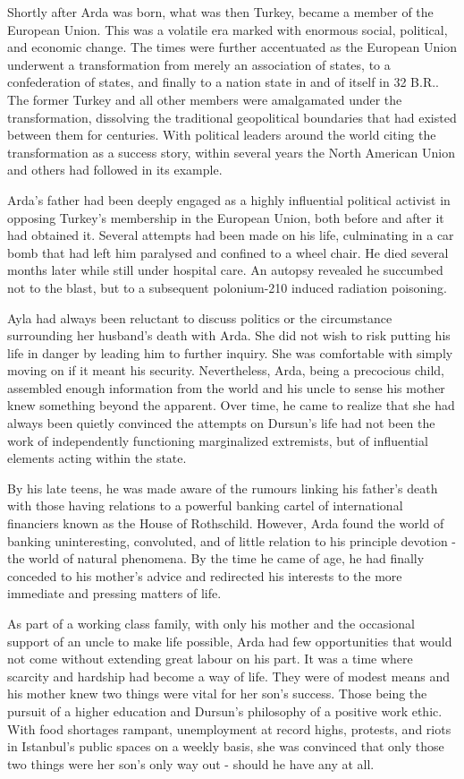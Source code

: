 Shortly after Arda was born, what was then Turkey, became a member of the European Union. This was a volatile era marked with enormous social, political, and economic change. The times were further accentuated as the European Union underwent a transformation from merely an association of states, to a confederation of states, and finally to a nation state in and of itself in 32 B.R.. The former Turkey and all other members were amalgamated under the transformation, dissolving the traditional geopolitical boundaries that had existed between them for centuries. With political leaders around the world citing the transformation as a success story, within several years the North American Union and others had followed in its example.

Arda's father had been deeply engaged as a highly influential political activist in opposing Turkey's membership in the European Union, both before and after it had obtained it. Several attempts had been made on his life, culminating in a car bomb that had left him paralysed and confined to a wheel chair. He died several months later while still under hospital care. An autopsy revealed he succumbed not to the blast, but to a subsequent polonium-210 induced radiation poisoning.

Ayla had always been reluctant to discuss politics or the circumstance surrounding her husband's death with Arda. She did not wish to risk putting his life in danger by leading him to further inquiry. She was comfortable with simply moving on if it meant his security. Nevertheless, Arda, being a precocious child, assembled enough information from the world and his uncle to sense his mother knew something beyond the apparent. Over time, he came to realize that she had always been quietly convinced the attempts on Dursun's life had not been the work of independently functioning marginalized extremists, but of influential elements acting within the state.

By his late teens, he was made aware of the rumours linking his father's death with those having relations to a powerful banking cartel of international financiers known as the House of Rothschild. However, Arda found the world of banking uninteresting, convoluted, and of little relation to his principle devotion - the world of natural phenomena. By the time he came of age, he had finally conceded to his mother's advice and redirected his interests to the more immediate and pressing matters of life.

As part of a working class family, with only his mother and the occasional support of an uncle to make life possible, Arda had few opportunities that would not come without extending great labour on his part. It was a time where scarcity and hardship had become a way of life. They were of modest means and his mother knew two things were vital for her son's success. Those being the pursuit of a higher education and Dursun's philosophy of a positive work ethic. With food shortages rampant, unemployment at record highs, protests, and riots in Istanbul's public spaces on a weekly basis, she was convinced that only those two things were her son's only way out - should he have any at all.


